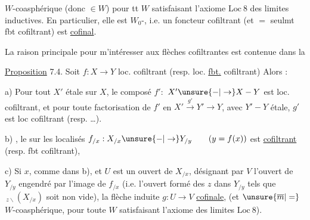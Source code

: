 $W$-coasphérique (donc $\in W$) pour tt  $W$
satisfaisant l'axiome $\mathrm{Loc}\ 8$ des limites
inductives. En particulier, elle est $W_0$-,
i.e. un foncteur cofiltrant  (et $=$
seulmt fbt cofiltrant) est  \uline{cofinal}.

La raison principale pour m'intéresser
aux flèches cofiltrantes est contenue
dans la

\uline{Proposition} 7.4. Soit $f:X\longrightarrow Y$  loc. cofiltrant
(resp. loc. \uline{fbt.} cofiltrant)
Alors : 

a) Pour tout $X'$ étale sur $X$, le composé $f':$
$X'\unsure{-|\to}X-Y$ est loc. cofiltrant, et pour
toute factorisation de $f'$ en $X'\xrightarrow{g'}Y'\longrightarrow Y$,
avec $Y'-Y$ étale, $g'$ est loc cofiltrant (resp. \ldots).

b) ,  le  sur les localisés
 $f_{/x}:X_{/x}\unsure{-|\to}Y_{/y}\qquad(y=f(x))$
est \uline{cofiltrant} (resp. fbt cofiltrant),

 c) Si $x$,  comme dans b), et
$U$ est un ouvert de $X_{/x}$, désignant
par $V$ l'ouvert de $Y_{/y}$ engendré par
l'image de $f_{/x}$ (i.e. l'ouvert formé des
$z$ dans $Y_{/y}$ tels que $\,{}_{z\backslash}(X_{/x})$ soit non vide),
la flèche induite $g:U\longrightarrow V$   \uline{cofinale},
(et $\unsure{\overline{m}|=}$ $W$-coasphérique, pour toute $W$
satisfaisant l'axiome des limites $\mathrm{Loc}\ 8$).
